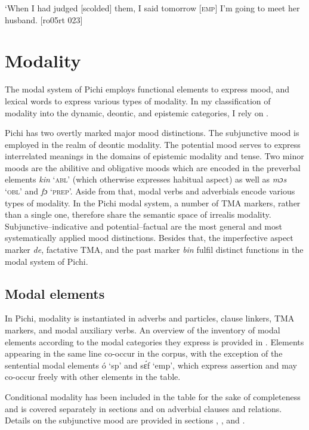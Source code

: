 \glt ‘When I had judged [scolded] them, I said tomorrow \textsc{[emp]} 
I’m going to meet her husband. [ro05rt 023]
\z

\section{Modality}\label{sec:6.7}

The modal system of Pichi employs functional elements to express mood, and lexical words to express various types of modality. In my classification of modality into the dynamic, deontic, and epistemic categories, I rely on \citep{Palmer2001}.


Pichi has two overtly marked major mood distinctions. The subjunctive mood is employed in the realm of deontic modality. The potential mood serves to express interrelated meanings in the domains of epistemic modality and tense. Two minor moods are the abilitive and obligative moods which are encoded in the preverbal elements \textit{kin} ‘\textsc{abl’} (which otherwise expresses habitual aspect) as well as \textit{mɔs} ‘\textsc{obl}’ and \textit{fɔ} ‘\textsc{prep}’. Aside from that, modal verbs and adverbials encode various types of modality. In the Pichi modal system, a number of TMA markers, rather than a single one, therefore share the semantic space of irrealis modality. Subjunctive–indicative and potential–factual are the most general and most systematically applied mood distinctions. Besides that, the imperfective aspect marker \textit{de}, factative TMA, and the past marker \textit{bin} fulfil distinct functions in the modal system of Pichi. 


\subsection{Modal elements}\label{sec:6.7.1}

In Pichi, modality is instantiated in adverbs and particles, clause linkers, TMA markers, and modal auxiliary verbs. An overview of the inventory of modal elements according to the modal categories they express is provided in . Elements appearing in the same line co-occur in the corpus, with the exception of the sentential modal elements ó ‘sp’ and sɛ́f ‘emp’, which express assertion and may co-occur freely with other elements in the table.


Conditional modality has been included in the table for the sake of completeness and is covered separately in sections  and  on adverbial clauses and relations. Details on the subjunctive mood are provided in sections , , and .


